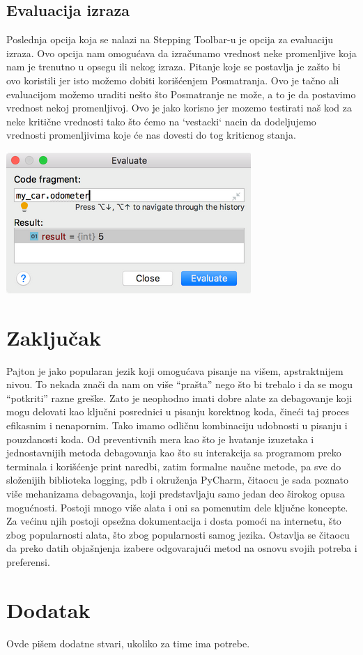 \documentclass[a4paper]{article}
\begin{document}
\subsection{Evaluacija izraza}
Poslednja opcija koja se nalazi na Stepping Toolbar-u je opcija za evaluaciju izraza. Ovo opcija nam omogućava da izračunamo vrednost neke promenljive koja nam je trenutno u opsegu ili nekog izraza\cite{pyCharm}. Pitanje koje se postavlja je zašto bi ovo koristili jer isto možemo dobiti korišćenjem Posmatranja. Ovo je tačno ali evaluacijom možemo uraditi nešto što Posmatranje ne može, a to je da postavimo vrednost nekoj promenljivoj\cite{pyCharm}. Ovo je jako korisno jer mozemo testirati naš kod za neke kritične vrednosti tako što ćemo na `vestacki` nacin da dodeljujemo vrednosti promenljivima koje će nas dovesti do tog kriticnog stanja.

\includegraphics[scale = 0.4]{4}
\section{Zaključak}
\label{sec:zakljucak}

Pajton je jako popularan jezik koji omogućava pisanje na višem, apstraktnijem nivou. To nekada znači da nam on više “prašta” nego što bi trebalo i da se mogu “potkriti” razne greške. Zato je neophodno imati dobre alate za debagovanje koji mogu delovati kao ključni posrednici u pisanju korektnog koda, čineći taj proces efikasnim i nenapornim. Tako imamo odličnu kombinaciju udobnosti u pisanju i pouzdanosti koda. Od preventivnih mera kao što je hvatanje izuzetaka i jednostavnijih metoda debagovanja kao što su interakcija sa programom preko terminala i korišćenje print naredbi, zatim formalne naučne metode, pa sve do složenijih biblioteka logging, pdb i okruženja PyCharm, čitaocu je sada poznato više mehanizama debagovanja, koji predstavljaju samo jedan deo širokog opusa mogućnosti. Postoji mnogo više alata i oni sa pomenutim dele ključne koncepte. Za većinu njih postoji opsežna dokumentacija i dosta pomoći na internetu, što zbog popularnosti alata, što zbog popularnosti samog jezika. Ostavlja se čitaocu da preko datih objašnjenja izabere odgovarajući metod na osnovu svojih potreba i preferensi.


\appendix
 


\newpage

\appendix
\section{Dodatak}
Ovde pišem dodatne stvari, ukoliko za time ima potrebe.
\end{document}
